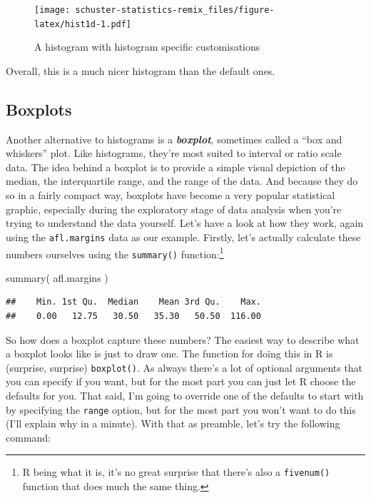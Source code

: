 \documentclass[
]{book}
\newenvironment{Shaded}{\begin{snugshade}}{\end{snugshade}}
\newcommand{\FunctionTok}[1]{\textcolor[rgb]{0.00,0.00,0.00}{#1}}
\newcommand{\NormalTok}[1]{#1}
\begin{document}
\begin{figure}
\centering
\texttt{[image: schuster-statistics-remix\_files/figure-latex/hist1d-1.pdf]}
\caption{\label{fig:hist1d}A histogram with histogram specific customisations}
\end{figure}

Overall, this is a much nicer histogram than the default ones.

\hypertarget{boxplots}{%
\subsection{Boxplots}\label{boxplots}}

Another alternative to histograms is a \textbf{\emph{boxplot}}, sometimes called a ``box and whiskers'' plot. Like histograms, they're most suited to interval or ratio scale data. The idea behind a boxplot is to provide a simple visual depiction of the median, the interquartile range, and the range of the data. And because they do so in a fairly compact way, boxplots have become a very popular statistical graphic, especially during the exploratory stage of data analysis when you're trying to understand the data yourself. Let's have a look at how they work, again using the \texttt{afl.margins} data as our example. Firstly, let's actually calculate these numbers ourselves using the \texttt{summary()} function:\footnote{R being what it is, it's no great surprise that there's also a \texttt{fivenum()} function that does much the same thing.}

\begin{Shaded}
\begin{Highlighting}[]
\FunctionTok{summary}\NormalTok{( afl.margins )}
\end{Highlighting}
\end{Shaded}

\begin{verbatim}
##    Min. 1st Qu.  Median    Mean 3rd Qu.    Max. 
##    0.00   12.75   30.50   35.30   50.50  116.00
\end{verbatim}

So how does a boxplot capture these numbers? The easiest way to describe what a boxplot looks like is just to draw one. The function for doing this in R is (surprise, surprise) \texttt{boxplot()}. As always there's a lot of optional arguments that you can specify if you want, but for the most part you can just let R choose the defaults for you. That said, I'm going to override one of the defaults to start with by specifying the \texttt{range} option, but for the most part you won't want to do this (I'll explain why in a minute). With that as preamble, let's try the following command:
\end{document}
